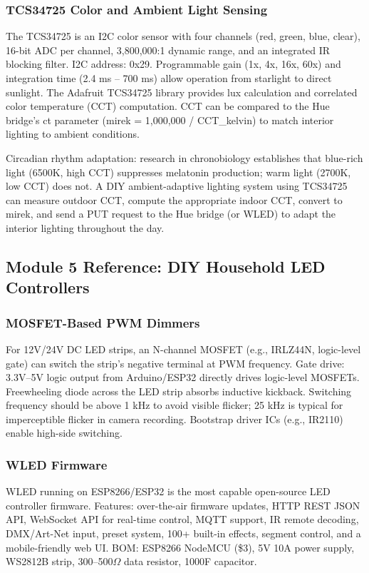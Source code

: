 \documentclass[11pt,letterpaper]{article}
\begin{document}
\subsubsection{TCS34725 Color and Ambient Light Sensing}

The TCS34725 is an I2C color sensor with four channels (red, green, blue, clear), 16-bit ADC per channel, 3,800,000:1 dynamic range, and an integrated IR blocking filter. I2C address: 0x29. Programmable gain (1x, 4x, 16x, 60x) and integration time (2.4 ms -- 700 ms) allow operation from starlight to direct sunlight. The Adafruit TCS34725 library provides lux calculation and correlated color temperature (CCT) computation. CCT can be compared to the Hue bridge's ct parameter (mirek = 1,000,000 / CCT\_kelvin) to match interior lighting to ambient conditions.

Circadian rhythm adaptation: research in chronobiology establishes that blue-rich light (6500K, high CCT) suppresses melatonin production; warm light (2700K, low CCT) does not. A DIY ambient-adaptive lighting system using TCS34725 can measure outdoor CCT, compute the appropriate indoor CCT, convert to mirek, and send a PUT request to the Hue bridge (or WLED) to adapt the interior lighting throughout the day.

\subsection{Module 5 Reference: DIY Household LED Controllers}

\subsubsection{MOSFET-Based PWM Dimmers}

For 12V/24V DC LED strips, an N-channel MOSFET (e.g., IRLZ44N, logic-level gate) can switch the strip's negative terminal at PWM frequency. Gate drive: 3.3V--5V logic output from Arduino/ESP32 directly drives logic-level MOSFETs. Freewheeling diode across the LED strip absorbs inductive kickback. Switching frequency should be above 1 kHz to avoid visible flicker; 25 kHz is typical for imperceptible flicker in camera recording. Bootstrap driver ICs (e.g., IR2110) enable high-side switching.

\subsubsection{WLED Firmware}

WLED running on ESP8266/ESP32 is the most capable open-source LED controller firmware. Features: over-the-air firmware updates, HTTP REST JSON API, WebSocket API for real-time control, MQTT support, IR remote decoding, DMX/Art-Net input, preset system, 100+ built-in effects, segment control, and a mobile-friendly web UI. BOM: ESP8266 NodeMCU (\$3), 5V 10A power supply, WS2812B strip, 300--500$\Omega$ data resistor, 1000\textmu F capacitor.
\end{document}
